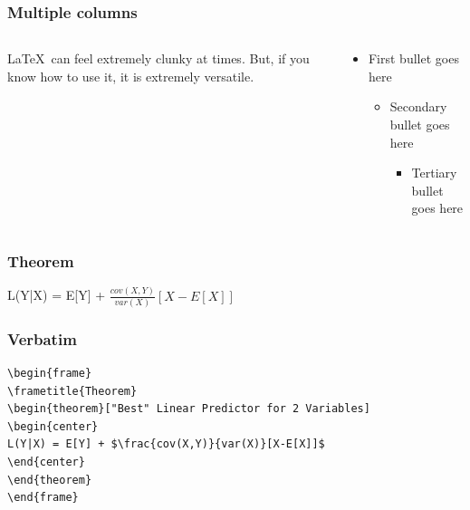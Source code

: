 \documentclass[10pt,xcolor={table,dvipsnames},t]{beamer}
\begin{document}
\begin{frame}
\frametitle{Multiple columns}

\begin{columns}[T]

\begin{column}{0.48\textwidth}
\small
\LaTeX \ can feel extremely clunky at times. \newline 
But, if you know how to use it, it is extremely versatile.
\end{column}

\begin{column}{0.48\textwidth}
\begin{itemize}
\item First bullet goes here
  \begin{itemize}
  \item Secondary bullet goes here
    \begin{itemize}
    \item Tertiary bullet goes here
    \end{itemize}
  \end{itemize}
\end{itemize}
\end{column}

\end{columns}
\end{frame}

\begin{frame}
\frametitle{Theorem}
\begin{theorem}
\begin{center} 
L(Y|X) = E[Y] + $\frac{cov(X,Y)}{var(X)}[X-E[X]]$
\end{center}
\end{theorem}
\end{frame}

\begin{frame}[fragile] %
\frametitle{Verbatim}
\begin{example}
\begin{verbatim}
\begin{frame}
\frametitle{Theorem}
\begin{theorem}["Best" Linear Predictor for 2 Variables]
\begin{center} 
L(Y|X) = E[Y] + $\frac{cov(X,Y)}{var(X)}[X-E[X]]$
\end{center}
\end{theorem}
\end{frame}\end{verbatim}
\end{example}
\end{frame}
\end{document}
